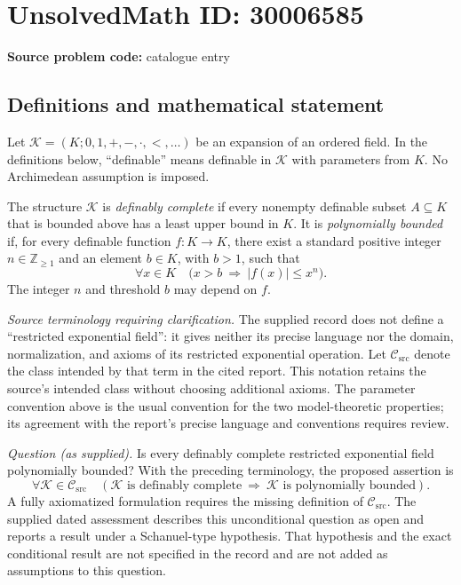 \documentclass[11pt]{article}
\begin{document}
\section*{UnsolvedMath ID: 30006585}
\textbf{Source problem code:} catalogue entry
\subsection{Definitions and mathematical statement}
Let \(\mathcal K=(K;0,1,+,-,\cdot,<,\ldots)\) be an expansion of an ordered field. In the definitions below, ``definable'' means definable in \(\mathcal K\) with parameters from \(K\). No Archimedean assumption is imposed.

The structure \(\mathcal K\) is \emph{definably complete} if every nonempty definable subset \(A\subseteq K\) that is bounded above has a least upper bound in \(K\). It is \emph{polynomially bounded} if, for every definable function \(f:K\to K\), there exist a standard positive integer \(n\in\mathbb Z_{\geq 1}\) and an element \(b\in K\), with \(b>1\), such that
\[
\forall x\in K\quad \bigl(x>b\ \Longrightarrow\ |f(x)|\leq x^n\bigr).
\]
The integer \(n\) and threshold \(b\) may depend on \(f\).

\emph{Source terminology requiring clarification.} The supplied record does not define a ``restricted exponential field'': it gives neither its precise language nor the domain, normalization, and axioms of its restricted exponential operation. Let \(\mathscr C_{\mathrm{src}}\) denote the class intended by that term in the cited report. This notation retains the source's intended class without choosing additional axioms. The parameter convention above is the usual convention for the two model-theoretic properties; its agreement with the report's precise language and conventions requires review.

\emph{Question (as supplied).} Is every definably complete restricted exponential field polynomially bounded? With the preceding terminology, the proposed assertion is
\[
\forall\mathcal K\in\mathscr C_{\mathrm{src}}\quad
\left(
\mathcal K\text{ is definably complete}
\ \Longrightarrow\
\mathcal K\text{ is polynomially bounded}
\right).
\]
A fully axiomatized formulation requires the missing definition of \(\mathscr C_{\mathrm{src}}\). The supplied dated assessment describes this unconditional question as open and reports a result under a Schanuel-type hypothesis. That hypothesis and the exact conditional result are not specified in the record and are not added as assumptions to this question.
\end{document}
